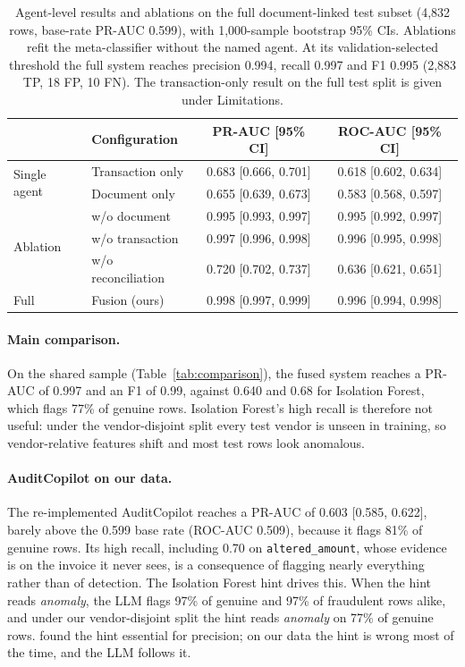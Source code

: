 \documentclass{article}
\newcommand{\typ}[1]{\texttt{#1}}
\begin{document}
\begin{table}[t]
  \caption{Agent-level results and ablations on the full document-linked test subset (4,832 rows, base-rate PR-AUC 0.599), with 1,000-sample bootstrap 95\% CIs. Ablations refit the meta-classifier without the named agent. At its validation-selected threshold the full system reaches precision 0.994, recall 0.997 and F1 0.995 (2,883 TP, 18 FP, 10 FN). The transaction-only result on the full test split is given under Limitations.}
  \label{tab:ablation}
  \centering
  \small
  \begin{tabular}{llcc}
    \toprule
    & Configuration & PR-AUC [95\% CI] & ROC-AUC [95\% CI] \\
    \midrule
    \multirow{2}{*}{Single agent} & Transaction only & 0.683 [0.666, 0.701] & 0.618 [0.602, 0.634] \\
                                  & Document only    & 0.655 [0.639, 0.673] & 0.583 [0.568, 0.597] \\
    \midrule
    \multirow{3}{*}{Ablation} & w/o document       & 0.995 [0.993, 0.997] & 0.995 [0.992, 0.997] \\
                              & w/o transaction    & 0.997 [0.996, 0.998] & 0.996 [0.995, 0.998] \\
                              & w/o reconciliation & 0.720 [0.702, 0.737] & 0.636 [0.621, 0.651] \\
    \midrule
    Full & Fusion (ours) & 0.998 [0.997, 0.999] & 0.996 [0.994, 0.998] \\
    \bottomrule
  \end{tabular}
\end{table}

\paragraph{Main comparison.} On the shared sample (Table~\ref{tab:comparison}), the fused system reaches a PR-AUC of 0.997 and an F1 of 0.99, against 0.640 and 0.68 for Isolation Forest, which flags 77\% of genuine rows. Isolation Forest's high recall is therefore not useful: under the vendor-disjoint split every test vendor is unseen in training, so vendor-relative features shift and most test rows look anomalous.

\paragraph{AuditCopilot on our data.} The re-implemented AuditCopilot reaches a PR-AUC of 0.603 [0.585, 0.622], barely above the 0.599 base rate (ROC-AUC 0.509), because it flags 81\% of genuine rows. Its high recall, including 0.70 on \typ{altered\_amount}, whose evidence is on the invoice it never sees, is a consequence of flagging nearly everything rather than of detection. The Isolation Forest hint drives this. When the hint reads \emph{anomaly}, the LLM flags 97\% of genuine and 97\% of fraudulent rows alike, and under our vendor-disjoint split the hint reads \emph{anomaly} on 77\% of genuine rows. \citet{kadir2025auditcopilot} found the hint essential for precision; on our data the hint is wrong most of the time, and the LLM follows it.
\end{document}
